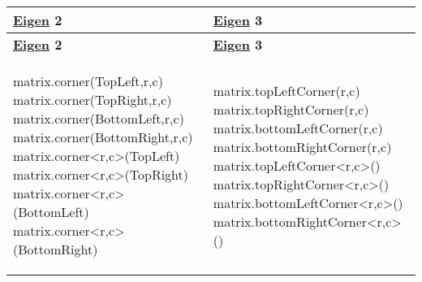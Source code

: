 \begin{longtabu} spread 0pt [c]{*{2}{|X[-1]}|}
\hline
\rowcolor{\tableheadbgcolor}\textbf{ \hyperlink{namespace_eigen}{Eigen} 2}&\textbf{ \hyperlink{namespace_eigen}{Eigen} 3 }\\
\endfirsthead
\hline
\endfoot
\hline
\rowcolor{\tableheadbgcolor}\textbf{ \hyperlink{namespace_eigen}{Eigen} 2}&\textbf{ \hyperlink{namespace_eigen}{Eigen} 3 }\\
\endhead

\begin{DoxyCode}
matrix.corner(TopLeft,r,c)
matrix.corner(TopRight,r,c)
matrix.corner(BottomLeft,r,c)
matrix.corner(BottomRight,r,c)
matrix.corner<r,c>(TopLeft)
matrix.corner<r,c>(TopRight)
matrix.corner<r,c>(BottomLeft)
matrix.corner<r,c>(BottomRight)
\end{DoxyCode}
&
\begin{DoxyCode}
matrix.topLeftCorner(r,c)
matrix.topRightCorner(r,c)
matrix.bottomLeftCorner(r,c)
matrix.bottomRightCorner(r,c)
matrix.topLeftCorner<r,c>()
matrix.topRightCorner<r,c>()
matrix.bottomLeftCorner<r,c>()
matrix.bottomRightCorner<r,c>()
\end{DoxyCode}
  \\
\end{longtabu}


